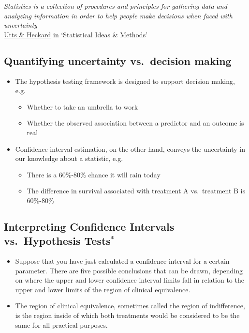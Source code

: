 \documentclass[
]{book}
\providecommand{\tightlist}{%
  \setlength{\itemsep}{0pt}\setlength{\parskip}{0pt}}
\begin{document}
\emph{Statistics is a collection of procedures and principles for gathering data and analyzing information in order to help people make decisions when faced with uncertainty}\\
\href{https://www.amazon.ca/Statistical-Methods-Internet-Companion-Statistics/dp/0495122505}{Utts \& Heckard} in `Statistical Ideas \& Methods'

\hypertarget{quantifying-uncertainty-vs.-decision-making}{%
\subsection{Quantifying uncertainty vs.~decision making}\label{quantifying-uncertainty-vs.-decision-making}}

\begin{itemize}
\tightlist
\item
  The hypothesis testing framework is designed to support decision making, e.g.~

  \begin{itemize}
  \tightlist
  \item
    Whether to take an umbrella to work
  \item
    Whether the observed association between a predictor and an outcome is real
  \end{itemize}
\item
  Confidence interval estimation, on the other hand, conveys the uncertainty in our knowledge about a statistic, e.g.

  \begin{itemize}
  \tightlist
  \item
    There is a 60\%-80\% chance it will rain today
  \item
    The difference in survival associated with treatment A vs.~treatment B is 60\%-80\%
  \end{itemize}
\end{itemize}

\hypertarget{interpreting-confidence-intervals-vs.-hypothesis-tests}{%
\subsection{\texorpdfstring{Interpreting Confidence Intervals vs.~Hypothesis Tests\(^*\)}{Interpreting Confidence Intervals vs.~Hypothesis Tests\^{}*}}\label{interpreting-confidence-intervals-vs.-hypothesis-tests}}

\begin{itemize}
\tightlist
\item
  Suppose that you have just calculated a confidence interval for a certain parameter. There are five possible conclusions that can be drawn, depending on where the upper and lower confidence interval limits fall in relation to the upper and lower limits of the region of clinical equivalence.
\item
  The region of clinical equivalence, sometimes called the region of indifference, is the region inside of which both treatments would be considered to be the same for all practical purposes.
\end{itemize}
\end{document}
